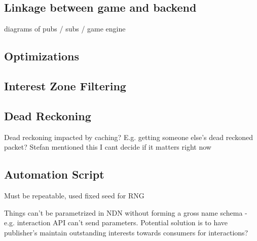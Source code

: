 \subsection{Linkage between game and backend}
diagrams of pubs / subs / game engine
\subsection{Optimizations}
\subsection*{Interest Zone Filtering}
\subsection*{Dead Reckoning}
Dead reckoning impacted by caching? E.g. getting someone else's dead reckoned packet? Stefan mentioned this I cant decide if it matters right now

\subsection{Automation Script}
Must be repeatable, used fixed seed for RNG

Things can't be parametrized in NDN without forming a gross name schema - e.g. interaction API can't send parameters. Potential solution is to have publisher's maintain outstanding interests towards consumers for interactions?